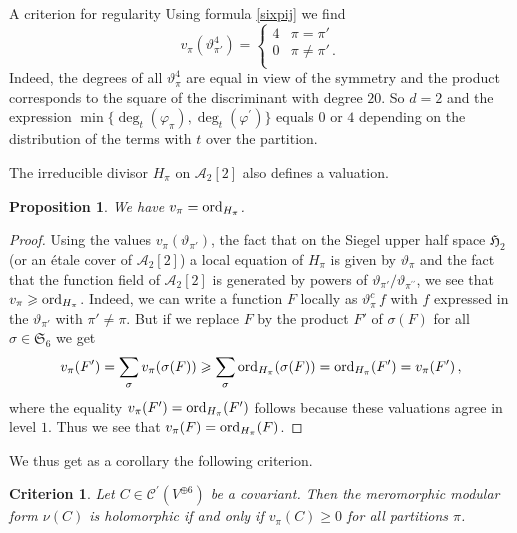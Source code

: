 \documentclass[12pt]{amsart}
\numberwithin{equation}{section}
\def\geq{\geqslant}
\numberwithin{equation}{section}
\newtheorem{proposition}[theorem]{Proposition}
\newtheorem{criterion}[theorem]{Criterion}
\theoremstyle{definition}
\theoremstyle{remark}
\begin{document}
\begin{section}{A criterion for regularity}
Using formula \ref{sixpij} we find
$$
v_{\pi}(\vartheta_{\pi'}^4)=\begin{cases}4 & \pi=\pi' \\
0 & \pi\neq \pi'\, . \\  
\end{cases}
$$
Indeed, the degrees of all $\vartheta_{\pi}^4$ are equal in view of the symmetry and
the product corresponds to the square of the discriminant with degree $20$. 
So $d=2$ and the expression 
$\min\{\deg_t (\varphi_{\pi}), \deg_t(\varphi^{\prime})\}$
equals $0$ or $4$ depending on the distribution of the terms with $t$ over the
partition.

The irreducible divisor $H_{\pi}$ on $\mathcal{A}_2[2]$ also defines a valuation.
\begin{proposition}
We have $v_{\pi}={\rm ord}_{H_{\pi}}$.
\end{proposition}
\begin{proof}
Using the values $v_{\pi}(\vartheta_{\pi'})$,
the fact that on the Siegel upper half space  $\mathfrak{H}_2$ (or an \'etale cover of
$\mathcal{A}_2[2]$) a local equation of $H_{\pi}$ is given by $\vartheta_{\pi}$ and
the fact that the function field of $\mathcal{A}_2[2]$ is generated by powers of
$\vartheta_{\pi'}/\vartheta_{\pi^{\prime\prime}}$, we see that
$v_{\pi}\geq {\rm ord}_{H_{\pi}}$. Indeed, we can write
a function $F$ locally as $\vartheta^c_{\pi}\, f$ with $f$ expressed in the $\vartheta_{\pi'}$ with $\pi'\neq \pi$.
But if we replace $F$ by the product $F'$ of $\sigma(F)$
for all $\sigma \in \mathfrak{S}_6$ we get
$$
v_{\pi}(F')=\sum_{\sigma} v_{\pi}(\sigma(F)) \geq 
\sum_{\sigma} {\rm ord}_{H_{\pi}}(\sigma(F))=
{\rm ord}_{H_{\pi}}(F')=v_{\pi}(F')\, ,
$$
where the equality $v_{\pi}(F')={\rm ord}_{H_{\pi}}(F')$ follows because these valuations agree in level $1$.
Thus we see that $v_{\pi}(F)={\rm ord}_{H_{\pi}}(F)$.

\end{proof}
We thus get as a corollary the following criterion.
\begin{criterion} Let $C\in \mathcal{C}^{\prime}(V^{\oplus 6})$ be a covariant.
Then the meromorphic modular form $\nu(C)$ is holomorphic
if and only if $v_{\pi}(C) \geq 0$ for all partitions $\pi$.
\end{criterion}
\end{section}
\end{document}
